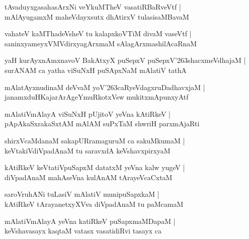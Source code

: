 \documentclass[twoside,12pt,openright]{book}
\def\S{\char'263}
\newcounter{shloka}[chapter]
\begin{document}
\begin{shloka}%
tAvaduyxgasahasArxNi veYkuMTheV vasatiRBaRveVtf |\\
mAlAyugamxM maheVdayxsutx dhAtirxV tulasisaMBavaM 
\end{shloka}

\begin{shloka}%
vahateV kaMThadeVsheV tu kalapxkoVTiM divaM vaseVtf |\\
saninxyameyxVMVdirxyagArxmaM sAlagArxmashilAcaRnaM 
\end{shloka}

\begin{shloka}%
yaH kurAyxnAmxnavoV BakAtxyX puSepxV puSepxV\S shacxmeVdhajaM |\\
surANAM ca yatha viSuNxH puSApxNaM mAlatiV tathA 
\end{shloka}

\begin{shloka}%
mAlatAyxnudinaM deVvaM yoV\S caRyeVdagxruDadhavxjaM |\\
janamxduHKajarArAgeYmuRkotxVsw mukitxmApunxyAtf 
\end{shloka}

\begin{shloka}%
mAlatiVmAlayA viSuNxH pUjitoV yeVna kAtiRkeV |\\
pApAkaSxrakaSxtAM mAlAM suPxTaM shwriH parxmAjaRti
\end{shloka}

\begin{shloka}%
shirxVcaMdanaM sakapURramaguruM ca sakuMkumaM |\\
keVtakiVdiVpadAnaM tu saravxdA keVshavxpirxyaM 
\end{shloka}

\begin{shloka}%
kAtiRkeV keVtatiVpuSapxM datatxM yeVna kalw yugeV |\\
diVpadAnaM mahAseVna kulAnAM tArayeVcaCxtaM 
\end{shloka}

\begin{shloka}%
saroVruhANi tuLasiV mAlatiV munipuSapxkaM |\\
kAtiRkeV tArayanetxyXVva diVpadAnaM tu paMcamaM 
\end{shloka}

\begin{shloka}%
mAlatiVmAlayA yeVna katiRkeV puSapxmaMDapaM |\\
keVshavasayx kaqtaM vatasx vasatidiRvi tasayx ca
\end{shloka}
\end{document}

